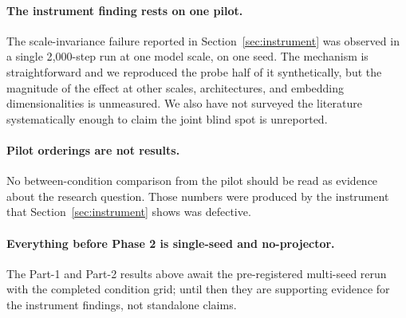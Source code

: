\paragraph{The instrument finding rests on one pilot.} \interp{} The scale-invariance
failure reported in Section~\ref{sec:instrument} was observed in a single 2{,}000-step
run at one model scale, on one seed. The mechanism is straightforward and we reproduced
the probe half of it synthetically, but the magnitude of the effect at other scales,
architectures, and embedding dimensionalities is unmeasured. We also have not surveyed
the literature systematically enough to claim the joint blind spot is unreported.

\paragraph{Pilot orderings are not results.} No between-condition comparison from the
pilot should be read as evidence about the research question. Those numbers were produced
by the instrument that Section~\ref{sec:instrument} shows was defective.

\paragraph{Everything before Phase 2 is single-seed and no-projector.} The Part-1 and
Part-2 results above await the pre-registered multi-seed rerun with the completed condition
grid; until then they are supporting evidence for the instrument findings, not standalone
claims.
